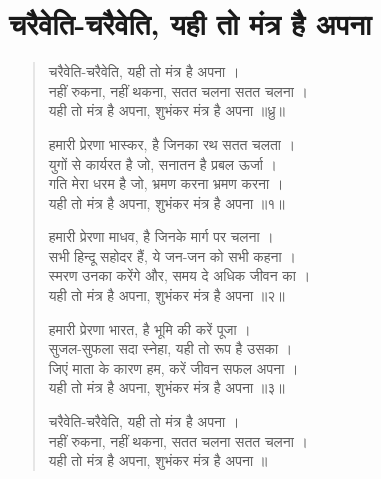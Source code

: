 \section{चरैवेति-चरैवेति, यही तो मंत्र है अपना}
\label{sec:charaiveti}

\begin{verse}
चरैवेति-चरैवेति, यही तो मंत्र है अपना ।\\
नहीं रुकना, नहीं थकना, सतत चलना सतत चलना ।\\
यही तो मंत्र है अपना, शुभंकर मंत्र है अपना ॥ध्रु॥

हमारी प्रेरणा भास्कर, है जिनका रथ सतत चलता ।\\
युगों से कार्यरत है जो, सनातन है प्रबल ऊर्जा ।\\
गति मेरा धरम है जो, भ्रमण करना भ्रमण करना ।\\
यही तो मंत्र है अपना, शुभंकर मंत्र है अपना ॥१॥

हमारी प्रेरणा माधव, है जिनके मार्ग पर चलना ।\\
सभी हिन्दू सहोदर हैं, ये जन-जन को सभी कहना ।\\
स्मरण उनका करेंगे और, समय दे अधिक जीवन का ।\\
यही तो मंत्र है अपना, शुभंकर मंत्र है अपना ॥२॥

हमारी प्रेरणा भारत, है भूमि की करें पूजा ।\\
सुजल-सुफला सदा स्नेहा, यही तो रूप है उसका ।\\
जिएं माता के कारण हम, करें जीवन सफल अपना ।\\
यही तो मंत्र है अपना, शुभंकर मंत्र है अपना ॥३॥

चरैवेति-चरैवेति, यही तो मंत्र है अपना ।\\
नहीं रुकना, नहीं थकना, सतत चलना सतत चलना ।\\
यही तो मंत्र है अपना, शुभंकर मंत्र है अपना ॥
\end{verse}
